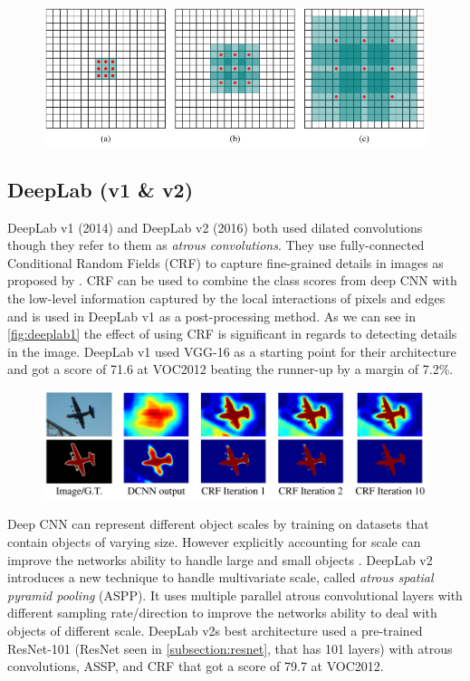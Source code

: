 \begin{figure}[H]
    \centering
    \includegraphics[width=0.7\linewidth]{fig/dilution.png}
    \label{fig:dilution}
\end{figure}


\subsection{DeepLab (v1 \& v2)}
DeepLab v1 (2014) \cite{Chen2014} and DeepLab v2 (2016) \cite{Chen2016} both used dilated convolutions though they refer to them as \emph{atrous convolutions}. They use fully-connected Conditional Random Fields (CRF) to capture fine-grained details in images as proposed by \citet{Krahenbuhl2012a}. CRF can be used to combine the class scores from deep CNN with the low-level information captured by the local interactions of pixels and edges \cite{Chen2014} and is used in DeepLab v1 as a post-processing method. As we can see in \autoref{fig:deeplab1} the effect of using CRF is significant in regards to detecting details in the image. DeepLab v1 used VGG-16 as a starting point for their architecture and got a score of 71.6 at VOC2012 beating the runner-up by a margin of 7.2\%. 

\begin{figure}[H]
    \centering
    \includegraphics[width=0.7\linewidth]{fig/deeplab1.png}
    \label{fig:deeplab1}
\end{figure}


Deep CNN can represent different object scales by training on datasets that contain objects of varying size. However explicitly accounting for scale can improve the networks ability to handle large and small objects \cite{Papandreou2015}. DeepLab v2 introduces a new technique to handle multivariate scale, called \emph{atrous spatial pyramid pooling} (ASPP). It uses multiple parallel atrous convolutional layers with different sampling rate/direction to improve the networks ability to deal with objects of different scale. DeepLab v2s best architecture used a pre-trained ResNet-101 (ResNet seen in \autoref{subsection:resnet}, that has 101 layers) with atrous convolutions, ASSP, and CRF that got a score of 79.7 at VOC2012.


